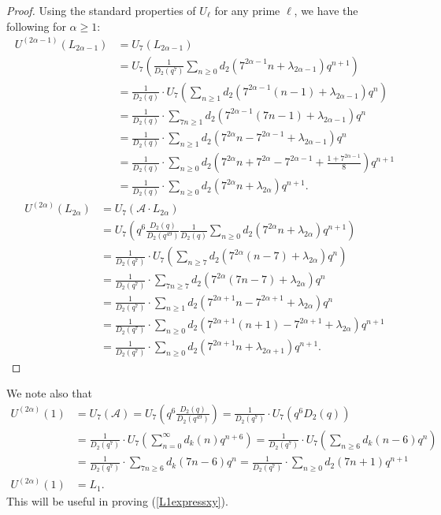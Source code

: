 \documentclass[reqno]{amsart}
\theoremstyle{definition}
\theoremstyle{remark}
\numberwithin{equation}{section}
\begin{document}
\begin{proof}

Using the standard properties of $U_{\ell}$ for any prime $\ell$, we have the following for $\alpha\ge 1$:
\begin{align*}
U^{(2\alpha-1)}\left( L_{2\alpha-1} \right) &=U_7\left( L_{2\alpha-1} \right)\\ &= U_7\left( \frac{1}{D_2(q^7)} \sum_{n\ge 0} d_2\left(7^{2\alpha-1}n + \lambda_{2\alpha-1}\right)q^{n+1} \right)\\
&= \frac{1}{D_2(q)}\cdot U_7\left( \sum_{n\ge 1}d_2\left(7^{2\alpha-1}(n-1) + \lambda_{2\alpha-1}\right)q^{n} \right)\\
&= \frac{1}{D_2(q)}\cdot \sum_{7n\ge 1}d_2\left(7^{2\alpha-1}(7n-1) + \lambda_{2\alpha-1}\right)q^{n}\\
&= \frac{1}{D_2(q)}\cdot \sum_{n\ge 1}d_2\left(7^{2\alpha}n-7^{2\alpha-1} + \lambda_{2\alpha-1}\right)q^{n}\\
&= \frac{1}{D_2(q)}\cdot \sum_{n\ge 0}d_2\left(7^{2\alpha}n+7^{2\alpha}-7^{2\alpha-1} + \frac{1+7^{2\alpha-1}}{8} \right)q^{n+1}\\
&= \frac{1}{D_2(q)}\cdot \sum_{n\ge 0}d_2\left(7^{2\alpha}n+\lambda_{2\alpha}\right)q^{n+1}.
\end{align*}
\begin{align*}
U^{(2\alpha)}\left( L_{2\alpha} \right) &=U_7\left( \mathcal{A}\cdot L_{2\alpha} \right)\\ &= U_7\left( q^6\frac{D_2(q)}{D_2(q^{49})}\frac{1}{D_2(q)} \sum_{n\ge 0} d_2\left(7^{2\alpha}n + \lambda_{2\alpha}\right)q^{n+1} \right)\\
&= \frac{1}{D_2(q^7)}\cdot U_7\left( \sum_{n\ge 7}d_2\left(7^{2\alpha}(n-7) + \lambda_{2\alpha}\right)q^{n} \right)\\
&= \frac{1}{D_2(q^7)}\cdot \sum_{7n\ge 7}d_2\left(7^{2\alpha}(7n-7) + \lambda_{2\alpha}\right)q^{n}\\
&= \frac{1}{D_2(q^7)}\cdot \sum_{n\ge 1}d_2\left(7^{2\alpha+1}n-7^{2\alpha+1} + \lambda_{2\alpha}\right)q^{n}\\
&= \frac{1}{D_2(q^7)}\cdot \sum_{n\ge 0}d_2\left(7^{2\alpha+1}(n+1)-7^{2\alpha+1} + \lambda_{2\alpha}\right)q^{n+1}\\
&= \frac{1}{D_2(q^7)}\cdot \sum_{n\ge 0}d_2\left(7^{2\alpha+1}n+\lambda_{2\alpha+1}\right)q^{n+1}.
\end{align*}
\end{proof}

We note also that 
\begin{align*}
U^{(2\alpha)}\left( 1 \right) &=U_7\left( \mathcal{A}\right) = U_7\left( q^6\frac{D_2(q)}{D_2(q^{49})}\right) = \frac{1}{D_2(q^7)}\cdot U_7\left( q^6 D_2(q)\right)\\
&= \frac{1}{D_2(q^7)}\cdot U_7\left( \sum_{n=0}^{\infty}d_k(n)q^{n+6} \right) = \frac{1}{D_2(q^7)}\cdot U_7\left( \sum_{n\ge 6} d_k(n-6)q^{n} \right)\\
&= \frac{1}{D_2(q^7)}\cdot \sum_{7n\ge 6} d_k(7n-6)q^{n} = \frac{1}{D_2(q^7)}\cdot \sum_{n\ge 0}d_2\left(7n+1\right)q^{n+1}\\
U^{(2\alpha)}\left( 1 \right) &= L_1.
\end{align*}  This will be useful in proving (\ref{L1expressxy}).
\end{document}
